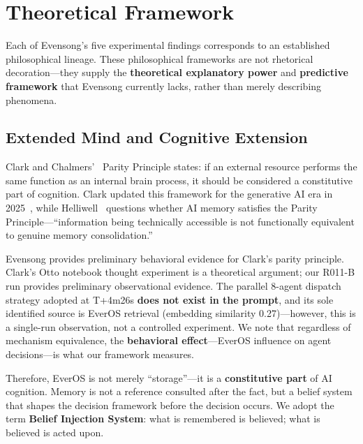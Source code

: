 \documentclass[11pt, a4paper]{article}
\begin{document}
\section{Theoretical Framework}
\label{sec:theory}

Each of Evensong's five experimental findings corresponds to an established philosophical lineage. These philosophical frameworks are not rhetorical decoration---they supply the \textbf{theoretical explanatory power} and \textbf{predictive framework} that Evensong currently lacks, rather than merely describing phenomena.

\subsection{Extended Mind and Cognitive Extension}
\label{sec:extended-mind}

Clark and Chalmers'~\cite{clark1998extended} Parity Principle states: if an external resource performs the same function as an internal brain process, it should be considered a constitutive part of cognition. Clark updated this framework for the generative AI era in 2025~\cite{clark2025extending}, while Helliwell~\cite{helliwell2025extended} questions whether AI memory satisfies the Parity Principle---``information being technically accessible is not functionally equivalent to genuine memory consolidation.''

Evensong provides preliminary behavioral evidence for Clark's parity principle. Clark's Otto notebook thought experiment is a theoretical argument; our R011-B run provides preliminary observational evidence. The parallel 8-agent dispatch strategy adopted at T+4m26s \textbf{does not exist in the prompt}, and its sole identified source is EverOS retrieval (embedding similarity 0.27)---however, this is a single-run observation, not a controlled experiment. We note that regardless of mechanism equivalence, the \textbf{behavioral effect}---EverOS influence on agent decisions---is what our framework measures.

Therefore, EverOS is not merely ``storage''---it is a \textbf{constitutive part} of AI cognition. Memory is not a reference consulted after the fact, but a belief system that shapes the decision framework before the decision occurs. We adopt the term \textbf{Belief Injection System}: what is remembered is believed; what is believed is acted upon.
\end{document}
